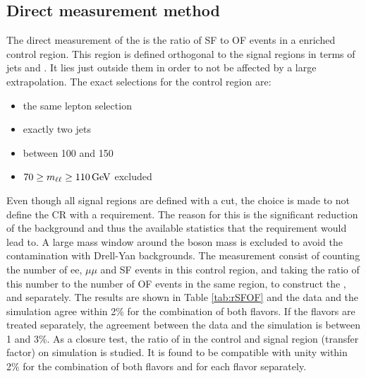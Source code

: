 \subsection*{Direct measurement method}\label{sec:rsfofDirect}
\noindent
\justify
The direct measurement of the \Rsfof is the ratio of SF to OF events in a \ttbar enriched control region. 
This region is defined orthogonal to the signal regions in terms of jets and \ptmiss. 
It lies just outside them in order to not be affected by a large extrapolation. 
The exact selections for the \ttbar control region are:
\begin{itemize}
    \item the same lepton selection
    \item exactly two jets
    \item \ptmiss between 100 and 150\GeV
    \item $70\geq m_{\ell\ell}\geq110\,\text{Ge\hspace{-.08em}V}$ excluded
\end{itemize}                                 
Even though all signal regions are defined with a \mttwo cut, the choice is made to not define the \ttbar CR with a \mttwo requirement. 
The reason for this is the significant reduction of the \ttbar background and thus the available statistics that the \mttwo requirement would lead to.
A large mass window around the \PZ boson mass is excluded to avoid the contamination with Drell-Yan backgrounds. 
The measurement consist of counting the number of ee, $\mu\mu$ and SF events in this control region, and taking the ratio of this number to the number of OF events in the same region, to construct the \Reeof, \Rmmof and \Rsfof separately. 
The results are shown in Table \ref{tab:rSFOF} and the data and the simulation agree within 2\% for the combination of both flavors. 
If the flavors are treated separately, the agreement between the data and the simulation is between 1 and 3\%. 
As a closure test, the ratio of \Rsfof in the control and signal region (transfer factor) on simulation is studied. 
It is found to be compatible with unity within 2\%  for the combination of both flavors and for each flavor separately.
